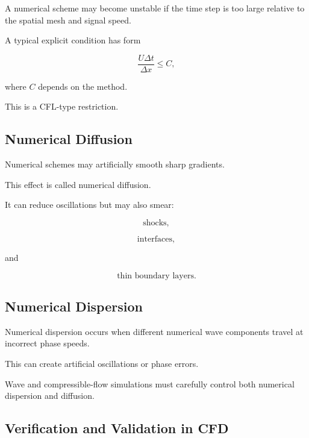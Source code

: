 A numerical scheme may become unstable if the time step is too large relative
to the spatial mesh and signal speed.

A typical explicit condition has form

\[
\boxed{
\frac{U\Delta t}{\Delta x}
\leq
C,
}
\]

where \(C\) depends on the method.

This is a CFL-type restriction.

\subsection{Numerical Diffusion}
\label{subsec:numerical-diffusion}

Numerical schemes may artificially smooth sharp gradients.

This effect is called numerical diffusion.

It can reduce oscillations but may also smear:

\[
\boxed{
\text{shocks},
}
\]

\[
\boxed{
\text{interfaces},
}
\]

and

\[
\boxed{
\text{thin boundary layers}.
}
\]

\subsection{Numerical Dispersion}
\label{subsec:numerical-dispersion}

Numerical dispersion occurs when different numerical wave components travel
at incorrect phase speeds.

This can create artificial oscillations or phase errors.

Wave and compressible-flow simulations must carefully control both numerical
dispersion and diffusion.

\subsection{Verification and Validation in CFD}
\label{subsec:cfd-verification-validation}


